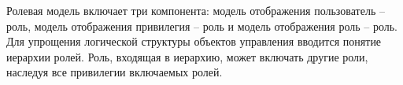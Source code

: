 \begin{enumerate}
	Ролевая модель включает три компонента: модель отображения пользователь -- роль, модель отображения привилегия -- роль и модель отображения роль -- роль. Для упрощения логической структуры объектов управления вводится понятие иерархии ролей. Роль, входящая в иерархию, может включать другие роли, наследуя все привилегии включаемых
	ролей.
\end{enumerate}
\clearpage
